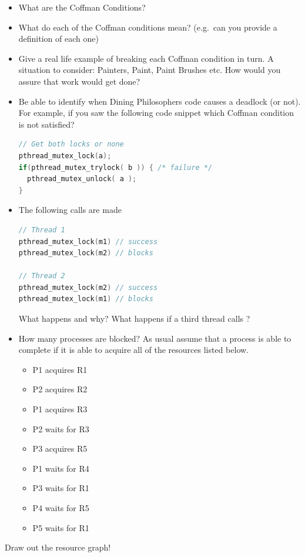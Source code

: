 \begin{itemize}
\item
  What are the Coffman Conditions?
\item
  What do each of the Coffman conditions mean? (e.g.~can you provide a definition of each one)
\item
  Give a real life example of breaking each Coffman condition in turn. A situation to consider: Painters, Paint, Paint Brushes etc. How would you assure that work would get done?
\item
  Be able to identify when Dining Philosophers code causes a deadlock (or not). For example, if you saw the following code snippet which Coffman condition is not satisfied?

\begin{lstlisting}[language=C]
// Get both locks or none
pthread_mutex_lock(a);
if(pthread_mutex_trylock( b )) { /* failure */
  pthread_mutex_unlock( a );
}
\end{lstlisting}
\item
  The following calls are made

\begin{lstlisting}[language=c]
// Thread 1
pthread_mutex_lock(m1) // success
pthread_mutex_lock(m2) // blocks

// Thread 2
pthread_mutex_lock(m2) // success
pthread_mutex_lock(m1) // blocks
\end{lstlisting}

  What happens and why? What happens if a third thread calls
   ?
\item
  How many processes are blocked? As usual assume that a process is able
  to complete if it is able to acquire all of the resources listed
  below.

  \begin{itemize}
  \tightlist
  \item
    P1 acquires R1
  \item
    P2 acquires R2
  \item
    P1 acquires R3
  \item
    P2 waits for R3
  \item
    P3 acquires R5
  \item
    P1 waits for R4
  \item
    P3 waits for R1
  \item
    P4 waits for R5
  \item
    P5 waits for R1
  \end{itemize}
\end{itemize}

Draw out the resource graph!



